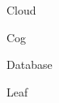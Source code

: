 \documentclass{article}
\begin{document}
Cloud \faCloud

Cog \faCog

Database \faDatabase

Leaf \faLeaf
\end{document}
